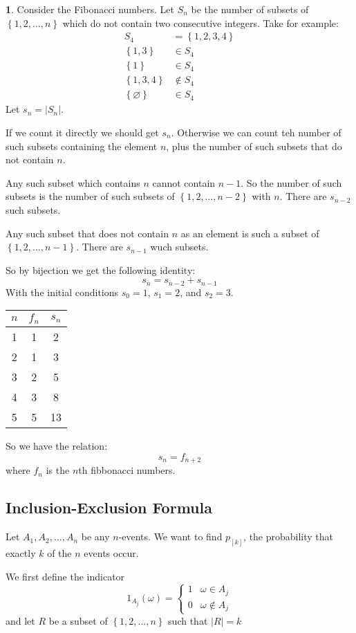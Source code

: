 \documentclass[english,12pt]{article}
\theoremstyle{plain}
\theoremstyle{definition}
\newtheorem*{example}{\protect\examplename}
\theoremstyle{definition} %
\newcommand{\eg}[1]{\begin{example} #1 \end{example} }
\providecommand{\examplename}{Example}
\newcommand{\sqbrac}[1]{\left[#1\right]} %
\newcommand{\curlybrac}[1]{\left\{#1\right\}} %
\begin{document}
\eg{
Consider the Fibonacci numbers.  Let $S_n$ be the number of subsets of $\curlybrac{1,2,\ldots, n}$ which do not contain two consecutive integers.  Take for example:
\begin{align*}
S_4&=\curlybrac{1,2,3,4}\\
\curlybrac{1,3}&\in S_4\\
\curlybrac{1}&\in S_4\\
\curlybrac{1,3,4}&\not\in S_4\\
\curlybrac{\varnothing}&\in S_4
\end{align*}
Let $s_n=|S_n|$.

If we count it directly we should get $s_n$.  Otherwise we can count teh number of such subsets containing the element $n$, plus the number of such subsets that do not contain $n$.

Any such subset which contains $n$ cannot contain $n-1$.  So the number of such subsets is the number of such subsets of $\curlybrac{1,2,\ldots,n-2}$ with $n$.  There are $s_{n-2}$ such subsets.

Any such subset that does not contain $n$ as an element is such a subset of $\curlybrac{1,2,\ldots,n-1}$.  There are $s_{n-1}$ wuch subsets.

So by bijection we get the following identity:
\[s_n=s_{n-2}+s_{n-1}\]
With the initial conditions $s_0=1$, $s_1=2$, and $s_2=3$.

\begin{center}
\begin{tabular}{|c|c|c|}
\hline
$n$ & $f_n$ & $s_n$\\
\hline
1 & 1 & 2\\
2 & 1 & 3\\
3 & 2 & 5\\
4 & 3 & 8\\
5 & 5 & 13\\
\hline
\end{tabular}
\end{center}

So we have the relation:
\[s_n=f_{n+2}\]
where $f_n$ is the $n$th fibbonacci numbers.
}

\subsection{Inclusion-Exclusion Formula}
Let $A_1,A_2,\ldots,A_n$ be any $n$-events.  We want to find $p_{\sqbrac{k}}$, the probability that exactly $k$ of the $n$ events occur.

We first define the indicator
\[1_{A_j}(\omega)=\begin{cases}1 & \omega\in A_j\\ 0 & \omega\not\in A_j\end{cases}\]
and let $R$ be a subset of $\curlybrac{1,2,\ldots,n}$ such that $|R|=k$
\end{document}
